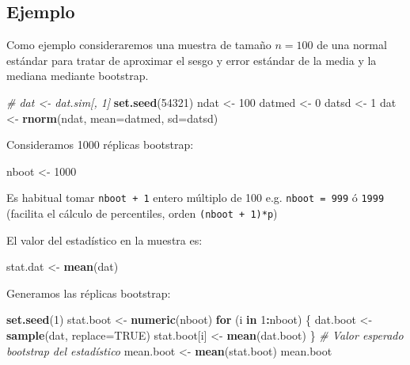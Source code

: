 \documentclass[]{book}
\newenvironment{Shaded}{\begin{snugshade}}{\end{snugshade}}
\newcommand{\KeywordTok}[1]{\textcolor[rgb]{0.13,0.29,0.53}{\textbf{#1}}}
\newcommand{\DataTypeTok}[1]{\textcolor[rgb]{0.13,0.29,0.53}{#1}}
\newcommand{\DecValTok}[1]{\textcolor[rgb]{0.00,0.00,0.81}{#1}}
\newcommand{\StringTok}[1]{\textcolor[rgb]{0.31,0.60,0.02}{#1}}
\newcommand{\CommentTok}[1]{\textcolor[rgb]{0.56,0.35,0.01}{\textit{#1}}}
\newcommand{\OtherTok}[1]{\textcolor[rgb]{0.56,0.35,0.01}{#1}}
\newcommand{\ControlFlowTok}[1]{\textcolor[rgb]{0.13,0.29,0.53}{\textbf{#1}}}
\newcommand{\OperatorTok}[1]{\textcolor[rgb]{0.81,0.36,0.00}{\textbf{#1}}}
\newcommand{\NormalTok}[1]{#1}
\theoremstyle{definition}
\theoremstyle{definition}
\theoremstyle{definition}
\theoremstyle{remark}
\begin{document}
\subsection{Ejemplo}\label{ejemplo-3}

Como ejemplo consideraremos una muestra de tamaño \(n=100\) de una
normal estándar para tratar de aproximar el sesgo y error estándar de la
media y la mediana mediante bootstrap.

\begin{Shaded}
\begin{Highlighting}[]
\CommentTok{# dat <- dat.sim[, 1]}
\KeywordTok{set.seed}\NormalTok{(}\DecValTok{54321}\NormalTok{)}
\NormalTok{ndat <-}\StringTok{ }\DecValTok{100}
\NormalTok{datmed <-}\StringTok{ }\DecValTok{0}
\NormalTok{datsd <-}\StringTok{ }\DecValTok{1}
\NormalTok{dat <-}\StringTok{ }\KeywordTok{rnorm}\NormalTok{(ndat, }\DataTypeTok{mean=}\NormalTok{datmed, }\DataTypeTok{sd=}\NormalTok{datsd)}
\end{Highlighting}
\end{Shaded}

Consideramos 1000 réplicas bootstrap:

\begin{Shaded}
\begin{Highlighting}[]
\NormalTok{nboot <-}\StringTok{ }\DecValTok{1000}  
\end{Highlighting}
\end{Shaded}

Es habitual tomar \texttt{nboot\ +\ 1} entero múltiplo de 100 e.g.
\texttt{nboot\ =\ 999} ó \texttt{1999} (facilita el cálculo de
percentiles, orden \texttt{(nboot\ +\ 1)*p})

El valor del estadístico en la muestra es:

\begin{Shaded}
\begin{Highlighting}[]
\NormalTok{stat.dat <-}\StringTok{ }\KeywordTok{mean}\NormalTok{(dat)}
\end{Highlighting}
\end{Shaded}

Generamos las réplicas bootstrap:

\begin{Shaded}
\begin{Highlighting}[]
\KeywordTok{set.seed}\NormalTok{(}\DecValTok{1}\NormalTok{)}
\NormalTok{stat.boot <-}\StringTok{ }\KeywordTok{numeric}\NormalTok{(nboot)}
\ControlFlowTok{for}\NormalTok{ (i }\ControlFlowTok{in} \DecValTok{1}\OperatorTok{:}\NormalTok{nboot) \{}
\NormalTok{  dat.boot <-}\StringTok{ }\KeywordTok{sample}\NormalTok{(dat, }\DataTypeTok{replace=}\OtherTok{TRUE}\NormalTok{)}
\NormalTok{  stat.boot[i] <-}\StringTok{ }\KeywordTok{mean}\NormalTok{(dat.boot)}
\NormalTok{\}}
\CommentTok{# Valor esperado bootstrap del estadístico}
\NormalTok{mean.boot <-}\StringTok{ }\KeywordTok{mean}\NormalTok{(stat.boot)  }
\NormalTok{mean.boot}
\end{Highlighting}
\end{Shaded}
\end{document}
